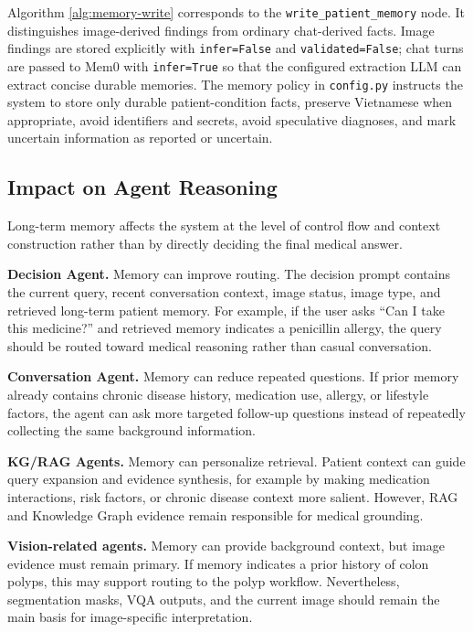 Algorithm \ref{alg:memory-write} corresponds to the \texttt{write\_patient\_memory} node. It distinguishes image-derived findings from ordinary chat-derived facts. Image findings are stored explicitly with \texttt{infer=False} and \texttt{validated=False}; chat turns are passed to Mem0 with \texttt{infer=True} so that the configured extraction LLM can extract concise durable memories. The memory policy in \texttt{config.py} instructs the system to store only durable patient-condition facts, preserve Vietnamese when appropriate, avoid identifiers and secrets, avoid speculative diagnoses, and mark uncertain information as reported or uncertain.

\subsection{Impact on Agent Reasoning}

Long-term memory affects the system at the level of control flow and context construction rather than by directly deciding the final medical answer.

\textbf{Decision Agent.} Memory can improve routing. The decision prompt contains the current query, recent conversation context, image status, image type, and retrieved long-term patient memory. For example, if the user asks ``Can I take this medicine?'' and retrieved memory indicates a penicillin allergy, the query should be routed toward medical reasoning rather than casual conversation.

\textbf{Conversation Agent.} Memory can reduce repeated questions. If prior memory already contains chronic disease history, medication use, allergy, or lifestyle factors, the agent can ask more targeted follow-up questions instead of repeatedly collecting the same background information.

\textbf{KG/RAG Agents.} Memory can personalize retrieval. Patient context can guide query expansion and evidence synthesis, for example by making medication interactions, risk factors, or chronic disease context more salient. However, RAG and Knowledge Graph evidence remain responsible for medical grounding.

\textbf{Vision-related agents.} Memory can provide background context, but image evidence must remain primary. If memory indicates a prior history of colon polyps, this may support routing to the polyp workflow. Nevertheless, segmentation masks, VQA outputs, and the current image should remain the main basis for image-specific interpretation.

